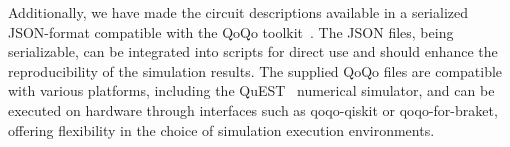 \documentclass[twocolumn,amsmath,amssymb,pra]{revtex4-2}
\begin{document}
Additionally, we have made the circuit descriptions available in a serialized JSON-format %
compatible with the QoQo toolkit~\cite{qoqo, qoqo_files_online}.
The JSON files, being serializable, can be integrated into scripts for direct use
and should enhance the reproducibility of the simulation results.
The supplied QoQo files are compatible with various platforms,
including the QuEST~\cite{quest} numerical simulator, and can be executed on hardware through interfaces such as qoqo-qiskit or qoqo-for-braket,
offering flexibility in the choice of simulation execution environments.







\end{document}
